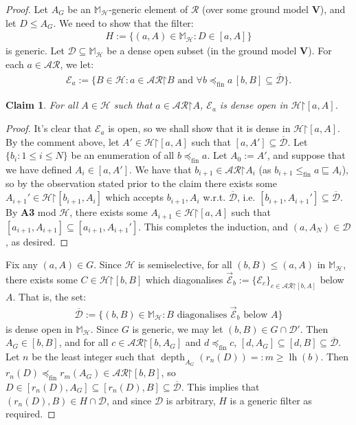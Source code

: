 \documentclass[10pt,a4paper]{amsart}
\theoremstyle{plain}
\numberwithin{equation}{section}
\newtheorem{claim}{Claim}
\theoremstyle{definition}
\newcommand{\func}{\operatorname}
\renewcommand{\bar}[1]{\overline{#1}}
\newcommand{\cal}{\mathcal}
\renewcommand{\bf}{\mathbf}
\newcommand{\restrictedto}{\mathord{\upharpoonright}}
\newcommand{\V}{\bf{V}}
\renewcommand{\H}{\cal{H}}
\newcommand{\lh}{\func{lh}}
\newcommand{\depth}{\func{depth}}
\newcommand{\fin}{\mathrm{fin}}
\newcommand{\D}{\cal{D}}
\newcommand{\E}{\cal{E}}
\newenvironment{midproof}[1][Proof]
  {\begin{proof}[#1]\renewcommand{\qedsymbol}{$\blacksquare$}}
  {\end{proof}}
\begin{document}
\begin{proof}
    Let $A_G$ be an $\mathbb{M}_\H$-generic element of $\cal{R}$ (over some ground model $\V$), and let $D \leq A_G$. We need to show that the filter: 
    \begin{align*}
        H := \{(a,A) \in \mathbb{M}_\H : D \in [a,A]\}
    \end{align*}
    is generic. Let $\D \subseteq \mathbb{M}_\H$ be a dense open subset (in the ground model $\V$). For each $a \in \cal{AR}$, we let:
    \begin{align*}
        \E_a := \{B \in \H : a \in \cal{AR}\restrictedto B \text{ and } \forall b \preceq_\fin a \, [b,B] \subseteq \bar{\D}\}.
    \end{align*} 

    \begin{claim}
        For all $A \in \H$ such that $a \in \cal{AR}\restrictedto A$, $\E_a$ is dense open in $\H\restrictedto[a,A]$.
    \end{claim}

    \begin{midproof}
        It's clear that $\E_a$ is open, so we shall show that it is dense in $\H\restrictedto[a,A]$. By the comment above, let $A' \in \H\restrictedto[a,A]$ such that $[a,A'] \subseteq \bar{\D}$. Let $\{b_i : 1 \leq i \leq N\}$ be an enumeration of all $b \preceq_\fin a$. Let $A_0 := A'$, and suppose that we have defined $A_i \in [a,A']$. We have that $b_{i+1} \in \cal{AR}\restrictedto A_i$ (as $b_{i+1} \leq_\fin a \sqsubseteq A_i$), so by the observation stated prior to the claim there exists some $A_{i+1}' \in \H\restrictedto[b_{i+1},A_i]$ which accepts $b_{i+1},A_i$ w.r.t. $\bar{\D}$, i.e. $[b_{i+1},A_{i+1}'] \subseteq \bar{\D}$. By \textbf{A3} mod $\H$, there exists some $A_{i+1} \in \H\restrictedto[a,A]$ such that $[a_{i+1},A_{i+1}] \subseteq [a_{i+1},A_{i+1}']$. This completes the induction, and $(a,A_N) \in \D$, as desired. 
    \end{midproof}

    Fix any $(a,A) \in G$. Since $\H$ is semiselective, for all $(b,B) \leq (a,A)$ in $\mathbb{M}_\H$, there exists some $C \in \H\restrictedto[b,B]$ which diagonalises $\vec{\E}_b := \{\E_c\}_{c\in\cal{AR}\restrictedto[b,A]}$ below $A$. That is, the set:
    \begin{align*}
        \bar{\D} := \{(b,B) \in \mathbb{M}_\H : \text{$B$ diagonalises $\vec{\E}_b$ below $A$}\}
    \end{align*}
    is dense open in $\mathbb{M}_\H$. Since $G$ is generic, we may let $(b,B) \in G \cap \D'$. Then $A_G \in [b,B]$, and for all $c \in \cal{AR}\restrictedto[b,A_G]$ and $d \preceq_\fin c$, $[d,A_G] \subseteq [d,B] \subseteq \bar{\D}$. Let $n$ be the least integer such that $\depth_{A_G}(r_n(D)) =: m \geq \lh(b)$. Then $r_n(D) \preceq_\fin r_m(A_G) \in \cal{AR}\restrictedto[b,B]$, so $D \in [r_n(D),A_G] \subseteq [r_n(D),B] \subseteq \bar{\D}$. This implies that $(r_n(D),B) \in H \cap \D$, and since $\D$ is arbitrary, $H$ is a generic filter as required.
\end{proof}
\end{document}
